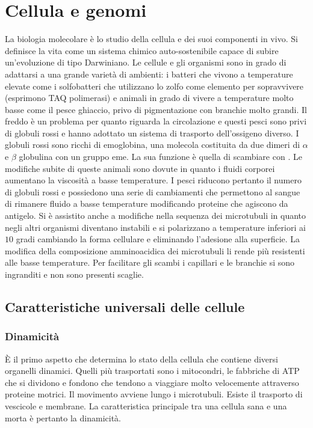 \section{Cellula e genomi}
La biologia molecolare \`e lo studio della cellula e dei suoi componenti in vivo. Si definisce la vita come un sistema chimico auto-sostenibile capace di subire un'evoluzione di tipo 
Darwiniano. Le cellule e gli organismi sono in grado di adattarsi a una grande variet\`a di ambienti: i batteri che vivono a temperature elevate come i solfobatteri che utilizzano lo 
zolfo come elemento per sopravvivere (esprimono TAQ polimerasi) e animali in grado di vivere a temperature molto basse come il pesce ghiaccio, privo di pigmentazione con branchie molto
grandi. Il freddo \`e un problema per quanto riguarda la circolazione e questi pesci sono privi di globuli rossi e hanno adottato un sistema di trasporto dell'ossigeno diverso. I globuli
rossi sono ricchi di emoglobina, una molecola costituita da due dimeri di $\alpha$ e $\beta$ globulina con un gruppo eme. La sua funzione \`e quella di scambiare \textbf{} con 
\textbf{}. Le modifiche subite di queste animali sono dovute in quanto i fluidi corporei aumentano la viscosit\`a a basse temperature. I pesci riducono pertanto il numero di 
globuli rossi e possiedono una serie di cambiamenti che permettono al sangue di rimanere fluido a basse temperature modificando proteine che agiscono da antigelo. Si \`e assistito anche 
a modifiche nella sequenza dei microtubuli in quanto negli altri organismi diventano instabili e si polarizzano a temperature inferiori ai $10$ gradi cambiando la forma cellulare e 
eliminando l'adesione alla superficie. La modifica della composizione amminoacidica dei microtubuli li rende pi\`u resistenti alle basse temperature. Per facilitare gli scambi i 
capillari e le branchie si sono ingranditi e non sono presenti scaglie. 
\subsection{Caratteristiche universali delle cellule}
\subsubsection{Dinamicit\`a}
\`E il primo aspetto che determina lo stato della cellula che contiene diversi organelli dinamici. Quelli pi\`u trasportati sono i mitocondri, le fabbriche di ATP che si dividono e 
fondono che tendono a viaggiare molto velocemente attraverso proteine motrici. Il movimento avviene lungo i microtubuli. Esiste il trasporto di vescicole e membrane. La caratteristica
principale tra una cellula sana e una morta \`e pertanto la dinamicit\`a. 
